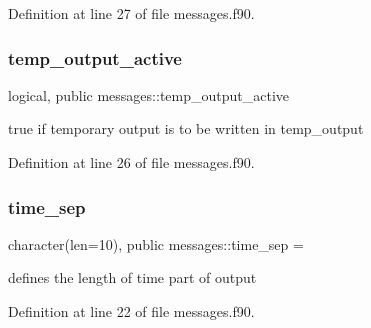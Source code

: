 Definition at line 27 of file messages.\+f90.

\mbox{\label{namespacemessages_ace8877914cfa5253cc002da0f387446a}} 
\subsubsection{\texorpdfstring{temp\+\_\+output\+\_\+active}{temp\_output\_active}}
{\footnotesize\ttfamily logical, public messages\+::temp\+\_\+output\+\_\+active}



true if temporary output is to be written in {\ttfamily temp\+\_\+output} 



Definition at line 26 of file messages.\+f90.

\mbox{\label{namespacemessages_abeb2abf0ac1d1fb4f09d881eb57b3dae}} 
\subsubsection{\texorpdfstring{time\+\_\+sep}{time\_sep}}
{\footnotesize\ttfamily character(len=10), public messages\+::time\+\_\+sep = \textquotesingle{}\textquotesingle{}}



defines the length of time part of output 



Definition at line 22 of file messages.\+f90.

